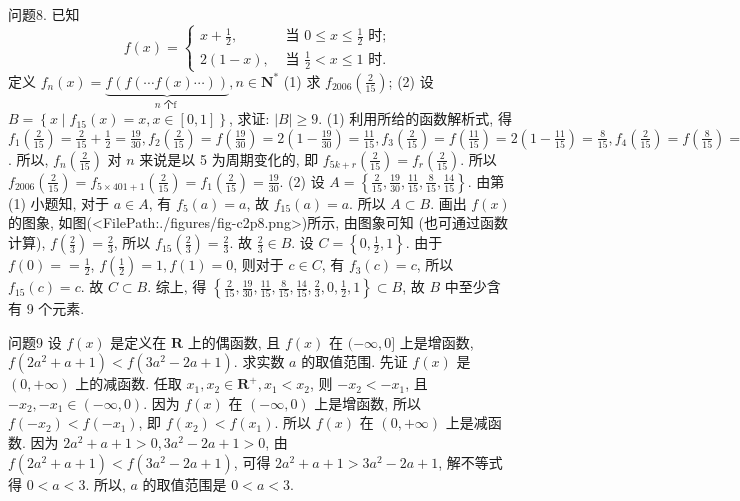 问题8. 已知
$$
f(x)=\left\{\begin{array}{cl}
x+\frac{1}{2}, & \text { 当 } 0 \leqslant x \leqslant \frac{1}{2} \text { 时; } \\
2(1-x), & \text { 当 } \frac{1}{2}<x \leqslant 1 \text { 时.
}
\end{array}\right.
$$
定义 $f_n(x)=\underbrace{f(f(\cdots f(x) \cdots))}_{n \text { 个f }}, n \in \mathbf{N}^*$
(1) 求 $f_{2006}\left(\frac{2}{15}\right)$;
(2) 设 $B=\left\{x \mid f_{15}(x)=x, x \in[0,1]\right\}$, 求证: $|B| \geqslant 9$.
(1) 利用所给的函数解析式, 得 $f_1\left(\frac{2}{15}\right)=\frac{2}{15}+\frac{1}{2}=\frac{19}{30}, f_2\left(\frac{2}{15}\right)= f\left(\frac{19}{30}\right)=2\left(1-\frac{19}{30}\right)=\frac{11}{15}, f_3\left(\frac{2}{15}\right)=f\left(\frac{11}{15}\right)=2\left(1-\frac{11}{15}\right)=\frac{8}{15}, f_4\left(\frac{2}{15}\right)= f\left(\frac{8}{15}\right)=2\left(1-\frac{8}{15}\right)=\frac{14}{15}, f_5\left(\frac{2}{15}\right)=f\left(\frac{14}{15}\right)=2\left(1-\frac{14}{15}\right)=\frac{2}{15}$. 所以, $f_n\left(\frac{2}{15}\right)$
对 $n$ 来说是以 5 为周期变化的, 即 $f_{5 k+r}\left(\frac{2}{15}\right)=f_r\left(\frac{2}{15}\right)$. 所以 $f_{2006}\left(\frac{2}{15}\right)= f_{5 \times 401+1}\left(\frac{2}{15}\right)=f_1\left(\frac{2}{15}\right)=\frac{19}{30}$.
(2) 设 $A=\left\{\frac{2}{15}, \frac{19}{30}, \frac{11}{15}, \frac{8}{15}, \frac{14}{15}\right\}$. 由第 (1) 小题知, 对于 $a \in A$, 有 $f_5(a)=a$, 故 $f_{15}(a)=a$. 所以 $A \subset B$. 画出 $f(x)$ 的图象, 如图(<FilePath:./figures/fig-c2p8.png>)所示, 由图象可知 (也可通过函数计算), $f\left(\frac{2}{3}\right)=\frac{2}{3}$, 所以 $f_{15}\left(\frac{2}{3}\right)=\frac{2}{3}$. 故 $\frac{2}{3} \in B$. 设 $C=\left\{0, \frac{1}{2}, 1\right\}$. 由于 $f(0)==\frac{1}{2}$, $f\left(\frac{1}{2}\right)=1, f(1)=0$, 则对于 $c \in C$, 有 $f_3(c)=c$, 所以 $f_{15}(c)=c$. 故 $C \subset B$. 综上, 得 $\left\{\frac{2}{15}, \frac{19}{30}, \frac{11}{15}, \frac{8}{15}, \frac{14}{15}, \frac{2}{3}, 0, \frac{1}{2}, 1\right\} \subset B$, 故 $B$ 中至少含有 9 个元素.



问题9 设 $f(x)$ 是定义在 $\mathbf{R}$ 上的偶函数, 且 $f(x)$ 在 $(-\infty, 0]$ 上是增函数, $f (2 a^2+ a+1)<f\left(3 a^2-2 a+1\right)$. 求实数 $a$ 的取值范围.
先证 $f(x)$ 是 $(0,+\infty)$ 上的减函数.
任取 $x_1, x_2 \in \mathbf{R}^{+}, x_1<x_2$, 则 $-x_2<-x_1$, 且 $-x_2,-x_1 \in(-\infty, 0)$. 因为 $f(x)$ 在 $(-\infty, 0)$ 上是增函数, 所以 $f\left(-x_2\right)<f\left(-x_1\right)$, 即 $f\left(x_2\right)<f\left(x_1\right)$. 所以 $f(x)$ 在 $(0,+\infty)$ 上是减函数.
因为 $2 a^2+a+1>0,3 a^2-2 a+1>0$, 由 $f\left(2 a^2+a+1\right)<f (3 a^2- 2 a+1)$, 可得 $2 a^2+a+1>3 a^2-2 a+1$, 解不等式得 $0<a<3$. 所以, $a$ 的取值范围是 $0<a<3$.



